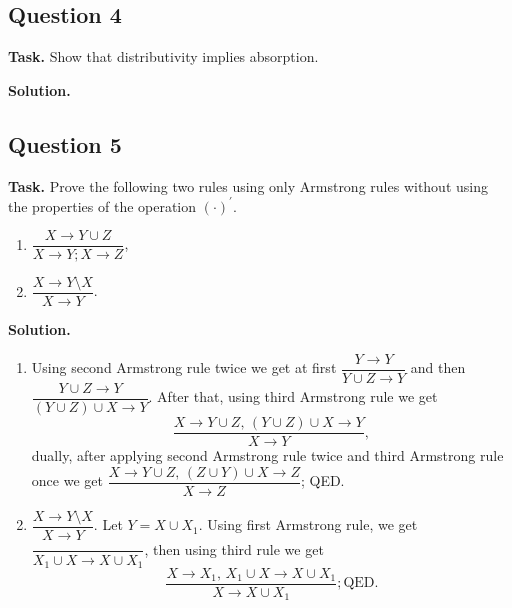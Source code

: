 \documentclass[14pt,a4paper]{extarticle}
\begin{document}
	\newpage
	\subsection*{Question 4}
	
	\noindent\textbf{Task.}  Show that distributivity implies absorption.
	
	\noindent\textbf{Solution.} 
	
	\newpage
	\subsection*{Question 5}
	
	\noindent\textbf{Task.}  Prove the following two rules using only Armstrong rules without using the properties of the operation $(\cdot)^\prime$.
	\begin{enumerate}
		\item $\dfrac{X\rightarrow Y\cup Z}{X\rightarrow Y; X\rightarrow Z}$,
		\item $\dfrac{X \rightarrow Y\setminus X}{X \rightarrow Y}$.
	\end{enumerate}
	\noindent\textbf{Solution.} 
	\begin{enumerate}
		\item Using second Armstrong rule twice we get at first $\dfrac{Y\rightarrow Y}{Y\cup Z\rightarrow Y}$ and then $\dfrac{Y\cup Z\rightarrow Y}{(Y\cup Z) \cup X\rightarrow Y}$. After that, using third Armstrong rule we get 
		\[\dfrac{X\rightarrow Y\cup Z,\, (Y \cup Z) \cup X \rightarrow Y}{X\rightarrow Y},\]
		dually, after applying second Armstrong rule twice and third Armstrong rule once we get $\dfrac{X\rightarrow Y\cup Z,\, (Z \cup Y) \cup X \rightarrow Z}{X\rightarrow Z}$; QED.
		\item $\dfrac{X \rightarrow Y\setminus X}{X \rightarrow Y}$. Let $Y=X\cup X_1$. Using first Armstrong rule, we get $\dfrac{}{X_1\cup X\rightarrow X\cup X_1}$, then using third rule we get 
		\[\dfrac{X\rightarrow X_1,\, X_1\cup X\rightarrow X\cup X_1}{X\rightarrow X\cup X_1}; \text{QED}.\]
	\end{enumerate}
\end{document}
